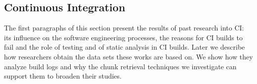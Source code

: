 \documentclass[\myrootdir/main.tex]{subfiles}
\begin{document}
\subsection{Continuous Integration}
\label{sec:rw-ci}
The first paragraphs of this section present the results of past research into CI: its influence on the software engineering processes, the reasons for CI builds to fail and the role of testing and of static analysis in CI builds.
Later we describe how researchers obtain the data sets these works are based on.
We show how they analyze build logs and why the chunk retrieval techniques we investigate can support them to broaden their studies.
\end{document}
